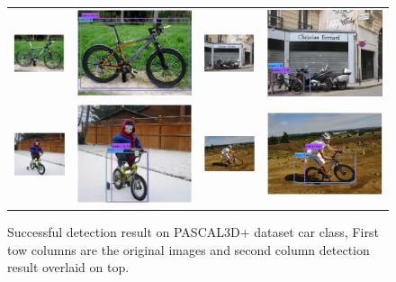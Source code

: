 \documentclass[10pt,twocolumn,letterpaper]{article}
\begin{document}
\begin{figure}[h]
\begin{tabular}{|cc|cc|}
  \includegraphics[width=0.22\linewidth]{supp/pas_bicycle1a.png} &
  \includegraphics[width=0.22\linewidth]{supp/pas_bicycle1b.png} & 
  \includegraphics[width=0.22\linewidth]{supp/pas_bicycle2a.png} &
  \includegraphics[width=0.22\linewidth]{supp/pas_bicycle2b.png}  \\
  \includegraphics[width=0.22\linewidth]{supp/pas_bicycle11a.png} &
  \includegraphics[width=0.22\linewidth]{supp/pas_bicycle11b.png} & 
  \includegraphics[width=0.22\linewidth]{supp/pas_bicycle12a.png} &
  \includegraphics[width=0.22\linewidth]{supp/pas_bicycle12b.png}  \\
  \hline
  \end{tabular}
\caption{Successful detection result on PASCAL3D+ dataset car class, First tow columns are the original images and second column detection result overlaid on top. }
  \label{fig:pascal3d_bicycle_good}
\end{figure}
\end{document}

